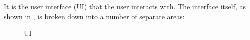 It is the user interface (UI) that the user interacts with. The interface itself, as
shown in , is broken down into a number of separate areas:

\begin{figure}[!htbp]
  \caption{UI}
  \label{fig:figure1}
\end{figure}


